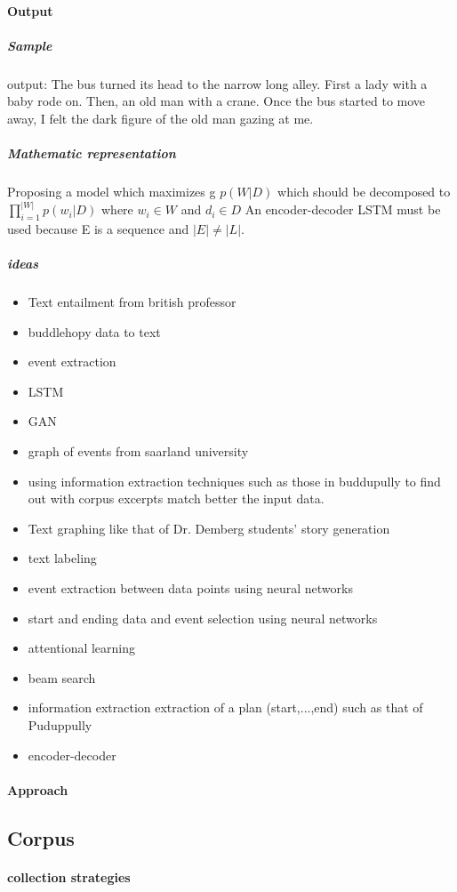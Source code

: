 \documentclass{article}
\begin{document}
			\paragraph{Output}
				\subparagraph{Sample}
					output: The bus turned its head to the narrow long alley. First a lady with a baby rode on. Then, an old man with a crane. Once the bus started to move away, I felt the dark figure of the old man gazing at me. 
				\subparagraph{Mathematic representation}
					Proposing a model which maximizes g $p(W|D)$ which should be decomposed to $\prod_{i=1}^{|W|}p(w_i|D)$ where $w_i\in W$ and $d_i \in D$
					An encoder-decoder LSTM must be used because E is a sequence and $|E|\ne |L|$. 
				\subparagraph{ideas}
					\begin{itemize}
						\item Text entailment from british professor
						\item buddlehopy data to text
						\item event extraction
						\item LSTM
						\item GAN
						\item graph of events from saarland university
						\item using information extraction techniques such as those in buddupully to find out with corpus excerpts match better the input data. 
						\item Text graphing like that of Dr. Demberg students' story generation
						\item text labeling
						\item event extraction between data points using neural networks
						\item start and ending data and event selection using neural networks
						\item attentional learning 
						\item beam search 
						\item information extraction
						extraction of a plan (start,...,end) such as that of Puduppully
						\item encoder-decoder
					\end{itemize}
			\paragraph{Approach}
			\subsection{Corpus}
				\paragraph{collection strategies}
\end{document}
